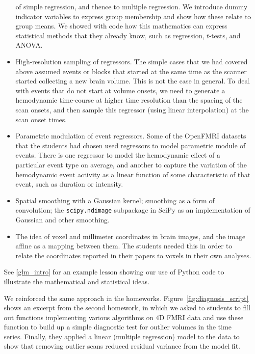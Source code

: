 \begin{itemize}
        of simple regression, and thence to multiple regression.  We introduce
        dummy indicator variables to express group membership and show how
        these relate to group means.  We showed with code how this mathematics
        can express statistical methods that they already know, such as
        regression, $t$-tests, and ANOVA.
\item
    High-resolution sampling of regressors.  The simple cases that we had
        covered above assumed events or blocks that started at the same time
        as the scanner started collecting a new brain volume.  This is not the
        case in general.  To deal with events that do not start at volume
        onsets, we need to generate a hemodynamic time-course at higher
        time resolution than the spacing of the scan onsets, and then sample
        this regressor (using linear interpolation) at the scan onset times.
\item
    Parametric modulation of event regressors.  Some of the OpenFMRI datasets
        that the students had chosen used regressors to model parametric
        module of events.  There is one regressor to model the hemodynamic
        effect of a particular event type on average, and another to capture
        the variation of the hemodynamic event activity as a linear function
        of some characteristic of that event, such as duration or intensity.
\item
    Spatial smoothing with a Gaussian kernel; smoothing as a form of
    convolution; the \texttt{scipy.ndimage} subpackage in SciPy as an
    implementation of Gaussian and other smoothing.

\item
    The idea of voxel and millimeter coordinates in brain images, and the
    image affine as a mapping between them.  The students needed this in order
    to relate the coordinates reported in their papers to voxels in their own
    analyses.

\end{itemize}

See \cref{glm_intro} for an example lesson showing our use of Python code to
illustrate the mathematical and statistical ideas.

We reinforced the same approach in the homeworks.
Figure~\ref{fig:diagnosis_script} shows an excerpt from the second homework,
in which we asked to students to fill out functions implementing various
algorithms on 4D FMRI data and use these function to build up a simple
diagnostic test for outlier volumes in the time series.  Finally, they
applied a linear (multiple regression) model to the data to show that removing
outlier scans reduced residual variance from the model fit.

